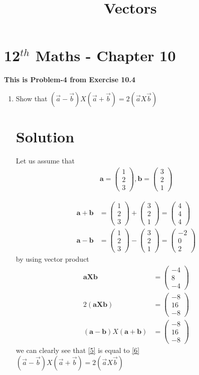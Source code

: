 \documentclass[12pt]{article}
\newcommand{\myvec}[1]{\ensuremath{\begin{pmatrix}#1\end{pmatrix}}}
\let\vec\mathbf
\begin{document}
\begin{center}
\title{\textbf{  Vectors}}
\date{\vspace{-5ex}} %
\maketitle
\end{center}
\setcounter{page}{1}
\section{12$^{th}$ Maths - Chapter 10}
\textbf{This is Problem-4 from Exercise 10.4}
\begin{enumerate}

\item Show that $(\overrightarrow{a}-\overrightarrow{b})X(\overrightarrow{a}+\overrightarrow{b})=2(\overrightarrow{a}X\overrightarrow{b})$ 
\section{Solution}
Let us assume that 
\begin{align}
\vec{a}=\myvec{1\\2\\3},
\vec{b}=\myvec{3\\2\\1}
\end{align}

\begin{align}
\vec{a+b}&=\myvec{1\\2\\3}+\myvec{3\\2\\1}=\myvec{4\\4\\4}\\
\vec{a-b}&=\myvec{1\\2\\3}-\myvec{3\\2\\1}=\myvec{-2\\0\\2}
\end{align}
by using vector product
\begin{align}
\vec{a X b}&= \myvec{-4\\8\\-4}\\
2(\vec{a X b})&= \myvec{-8\\16\\-8}\label{5}\\
(\vec{a-b}) X (\vec{a+b})&=\myvec{-8\\16\\-8}\label{6}
\end{align}
we can clearly see that \eqref{5} is equal to \eqref{6} \\
$(\overrightarrow{a}-\overrightarrow{b})X(\overrightarrow{a}+\overrightarrow{b})=2(\overrightarrow{a}X\overrightarrow{b})$
\end{enumerate} 
\end{document}
